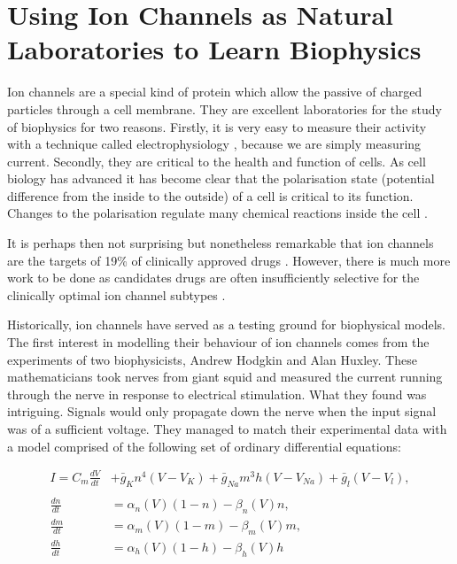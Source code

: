 \section{Using Ion Channels as Natural Laboratories to Learn Biophysics}

Ion channels are a special kind of protein which allow the passive of charged particles through a cell membrane. They are excellent laboratories for the study of biophysics for two reasons. Firstly, it is very easy to measure their activity with a technique called electrophysiology \cite{}, because we are simply measuring current. Secondly, they are critical to the health and function of cells. As cell biology has advanced it has become clear that the polarisation state (potential difference from the inside to the outside) of a cell is critical to its function. Changes to the polarisation regulate many chemical reactions inside the cell \cite{catterall2011, muthuswamy2012, levin2014, levin2014a}. 

It is perhaps then not surprising but nonetheless remarkable that ion channels are the targets of 19\% of clinically approved drugs \cite{santos2017}. However, there is much more work to be done as candidates drugs are often insufficiently selective for the clinically optimal ion channel subtypes \cite{stansfeld2006, kaczorowski2008, waszkielewicz2013}.

Historically, ion channels have served as a testing ground for biophysical models. The first interest in modelling their behaviour of ion channels comes from the experiments of two biophysicists, Andrew Hodgkin and Alan Huxley. These mathematicians took nerves from giant squid and measured the current running through the nerve in response to electrical stimulation. What they found was intriguing. Signals would only propagate down the nerve when the input signal was of a sufficient voltage. They managed to match their experimental data with a model comprised of the following set of ordinary differential equations:

\begin{equation}
	\label{hh_equations}
\begin{aligned}
	I = C_m \frac{dV}{dt} &+ \bar{g}_K n^4 (V - V_K) + \bar{g}_{Na} m^3 h (V - V_{Na} ) + \bar{g}_l (V-V_l) , \\ \\
	\frac{dn}{dt} &= \alpha_n(V)  (1-n) - \beta_n(V)  n, \\
	\frac{dm}{dt} &= \alpha_m(V)  (1-m) - \beta_m(V)  m, \\ 
	\frac{dh}{dt} &= \alpha_h(V)  (1-h) - \beta_h(V)  h  
\end{aligned}
\end{equation}

